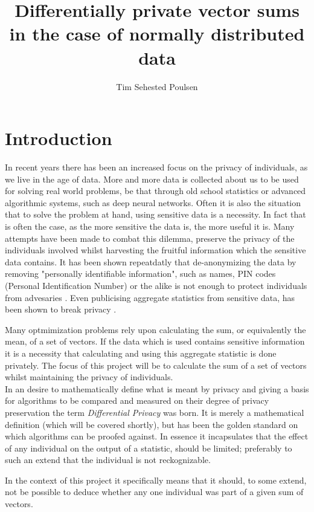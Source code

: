\documentclass[a4paper,12pt]{article}
\title{Differentially private vector sums in the case of normally distributed data}
\author{Tim Sehested Poulsen}
\begin{document}
\maketitle
\section{Introduction}
In recent years there has been an increased focus on the privacy of individuals, as we live in the age of data.
More and more data is collected about us to be used for solving real world problems, be that through old school statistics or 
advanced algorithmic systems, such as deep neural networks.
Often it is also the situation that to solve the problem at hand, using sensitive data is a necessity. 
In fact that is often the case, as the more sensitive the data is, the more useful it is.
Many attempts have been made to combat this dilemma, preserve the privacy of the individuals involved whilst harvesting the 
fruitful information which the sensitive data contains.
It has been shown repeatdatly  that de-anonymizing the data by removing "personally identiﬁable information", such as names, PIN codes (Personal Identification Number) or the alike is not enough
to protect individuals from advesaries \cite{medical,netflix}. 
Even publicising aggregate statistics from sensitive data, has been shown to break privacy \cite{exposed}.

\noindent Many optmimization problems rely upon calculating the sum, or equivalently the mean,
of a set of vectors.
If the data which is used contains sensitive information it is a necessity that
calculating and using this aggregate statistic is done privately. 
The focus of this project will be to calculate the sum of a set of vectors whilst
maintaining the privacy of individuals. \\

In an desire to mathematically define what is meant by privacy and giving a basis for algorithms to be compared and measured on their degree of privacy preservation 
the term \textit{Differential Privacy} was born. It is merely a mathematical definition (which will be covered shortly), but has been the golden standard on which
algorithms can be proofed against.
In essence it incapsulates that the effect of any individual on the output of a statistic,
should be limited; preferably to such an extend that the individual is not reckognizable.

\noindent In the context of this project it specifically means that it should, 
to some extend, not be possible to deduce whether any one individual was part of a given sum of vectors.
\end{document}
